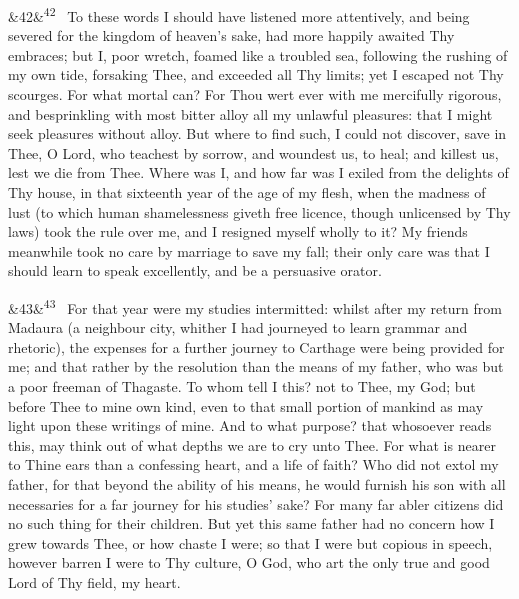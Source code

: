 \documentclass[12pt]{article}
\newcommand{\para}[1][]{\par\noindent\ifx&#1&\else\textsuperscript{\footnotesize #1}~\fi}
\begin{document}
\para[42] To these words I should have listened more attentively, and being severed for the kingdom of heaven's sake, had more happily awaited Thy embraces; but I, poor wretch, foamed like a troubled sea, following the rushing of my own tide, forsaking Thee, and exceeded all Thy limits; yet I escaped not Thy scourges. For what mortal can? For Thou wert ever with me mercifully rigorous, and besprinkling with most bitter alloy all my unlawful pleasures: that I might seek pleasures without alloy. But where to find such, I could not discover, save in Thee, O Lord, who teachest by sorrow, and woundest us, to heal; and killest us, lest we die from Thee. Where was I, and how far was I exiled from the delights of Thy house, in that sixteenth year of the age of my flesh, when the madness of lust (to which human shamelessness giveth free licence, though unlicensed by Thy laws) took the rule over me, and I resigned myself wholly to it? My friends meanwhile took no care by marriage to save my fall; their only care was that I should learn to speak excellently, and be a persuasive orator.

\para[43] For that year were my studies intermitted: whilst after my return from Madaura (a neighbour city, whither I had journeyed to learn grammar and rhetoric), the expenses for a further journey to Carthage were being provided for me; and that rather by the resolution than the means of my father, who was but a poor freeman of Thagaste. To whom tell I this? not to Thee, my God; but before Thee to mine own kind, even to that small portion of mankind as may light upon these writings of mine. And to what purpose? that whosoever reads this, may think out of what depths we are to cry unto Thee. For what is nearer to Thine ears than a confessing heart, and a life of faith? Who did not extol my father, for that beyond the ability of his means, he would furnish his son with all necessaries for a far journey for his studies' sake? For many far abler citizens did no such thing for their children. But yet this same father had no concern how I grew towards Thee, or how chaste I were; so that I were but copious in speech, however barren I were to Thy culture, O God, who art the only true and good Lord of Thy field, my heart.
\end{document}
